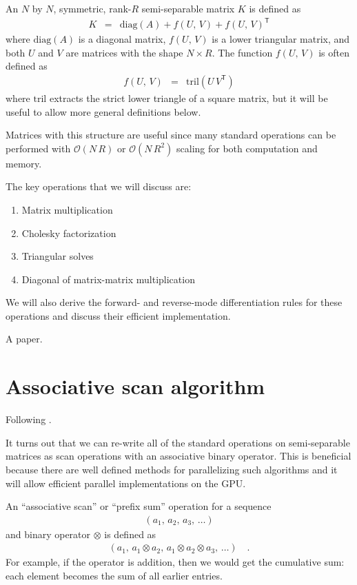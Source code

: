 \documentclass[10pt]{article}
\newcommand{\T}{^{\!\mathsf{T}\!}}
\begin{document}
An $N$ by $N$, symmetric, rank-$R$ semi-separable matrix $K$ is defined as
\begin{eqnarray}
  K &=& \mathrm{diag}(A) + f(U,\, V) + f(U,\, V)\T
\end{eqnarray}
where $\mathrm{diag}(A)$ is a diagonal matrix, $f(U,\, V)$ is a lower triangular matrix, and both $U$ and $V$ are matrices with the shape $N \times R$.
The function $f(U,\, V)$ is often defined as
\begin{eqnarray}
  f(U,\, V) &=& \mathrm{tril}(U \, V\T)
\end{eqnarray}
where $\mathrm{tril}$ extracts the strict lower triangle of a square matrix, but it will be useful to allow more general definitions below.

Matrices with this structure are useful since many standard operations can be performed with $\mathcal{O}(N\,R)$ or $\mathcal{O}(N\,R^2)$ scaling for both computation and memory.

The key operations that we will discuss are:

\begin{enumerate}
  \item Matrix multiplication
  \item Cholesky factorization
  \item Triangular solves
  \item Diagonal of matrix-matrix multiplication
\end{enumerate}

We will also derive the forward- and reverse-mode differentiation rules for these operations and discuss their efficient implementation.

A paper. \citep{foreman-mackey2017,foreman-mackey2018,gordon2020}

\citep{loper2020,hu2020}

\section{Associative scan algorithm}

Following \citep{sarkka2021}.

It turns out that we can re-write all of the standard operations on semi-separable matrices as scan operations with an associative binary operator.
This is beneficial because there are well defined methods for parallelizing such algorithms and it will allow efficient parallel implementations on the GPU.

An ``associative scan'' or ``prefix sum'' operation for a sequence
\begin{eqnarray}
  (a_1,\, a_2,\, a_3,\, \ldots)
\end{eqnarray}
and binary operator $\otimes$ is defined as
\begin{eqnarray}
  (a_1,\, a_1 \otimes a_2,\, a_1 \otimes a_2 \otimes a_3,\, \ldots)\quad.
\end{eqnarray}
For example, if the operator is addition, then we would get the cumulative sum: each element becomes the sum of all earlier entries.
\end{document}
